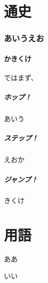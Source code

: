 \documentclass[head_space=20mm,foot_space=20mm,gutter=10mm,line_length=190mm]{jlreq}
\newcommand{\hop}[0]{\subsubsection*{ホップ！}}
\newcommand{\step}[0]{\subsubsection*{ステップ！}}
\newcommand{\jump}[0]{\subsubsection*{ジャンプ！}}
\begin{document}
\maketitle


\tableofcontents %

\clearpage

\part{通史}

\section{あいうえお}
\subsection{かきくけ}
ではまず、
\hop
あいう
\step
えおか
\jump
きくけ

\part{用語}

\clearpage
\begin{thebibliography}{99}
\item ああ
\item いい
\end{thebibliography}
\end{document}
